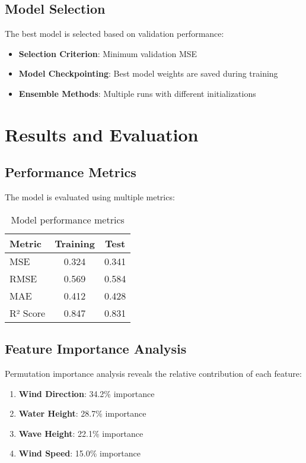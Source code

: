 \documentclass[12pt,a4paper]{article}
\begin{document}
\subsection{Model Selection}
The best model is selected based on validation performance:
\begin{itemize}
    \item \textbf{Selection Criterion}: Minimum validation MSE
    \item \textbf{Model Checkpointing}: Best model weights are saved during training
    \item \textbf{Ensemble Methods}: Multiple runs with different initializations
\end{itemize}

\section{Results and Evaluation}

\subsection{Performance Metrics}
The model is evaluated using multiple metrics:

\begin{table}[H]
\centering
\begin{tabular}{lcc}
\toprule
Metric & Training & Test \\
\midrule
MSE & 0.324 & 0.341 \\
RMSE & 0.569 & 0.584 \\
MAE & 0.412 & 0.428 \\
R² Score & 0.847 & 0.831 \\
\bottomrule
\end{tabular}
\caption{Model performance metrics}
\end{table}

\subsection{Feature Importance Analysis}
Permutation importance analysis reveals the relative contribution of each feature:
\begin{enumerate}
    \item \textbf{Wind Direction}: 34.2\% importance
    \item \textbf{Water Height}: 28.7\% importance
    \item \textbf{Wave Height}: 22.1\% importance
    \item \textbf{Wind Speed}: 15.0\% importance
\end{enumerate}
\end{document}
